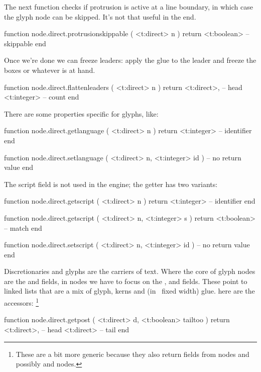 
The next function checks if protrusion is active at a line boundary, in which case the glyph
node can be skipped. It's not that useful in the end.

\starttyping[option=LUA]
function node.direct.protrusionskippable ( <t:direct> n )
    return <t:boolean> -- skippable
end
\stoptyping

Once we're done we can freeze leaders: apply the glue to the leader and freeze
the boxes or whatever is at hand.

\starttyping[option=LUA]
function node.direct.flattenleaders ( <t:direct> n )
    return
        <t:direct>, -- head
        <t:integer> -- count
end
\stoptyping

There are some properties specific for glyphs, like:

\starttyping[option=LUA]
function node.direct.getlanguage ( <t:direct> n )
    return <t:integer> -- identifier
end

function node.direct.setlanguage (
    <t:direct>  n,
    <t:integer> id
)
    -- no return value
end
\stoptyping

The script field is not used in the engine; the getter has two variants:

\starttyping[option=LUA]
function node.direct.getscript ( <t:direct> n )
    return <t:integer> -- identifier
end

function node.direct.getscript ( <t:direct> n, <t:integer> s )
    return <t:boolean> -- match
end

function node.direct.setscript (
    <t:direct>  n,
    <t:integer> id
)
    -- no return value
end
\stoptyping

\stopsubsection

\startsubsection[title=Discretionaries]

Discretionaries and glyphs are the carriers of text. Where the core of \type
{glyph} nodes are the  and  fields, in  nodes
we have to focus on the ,  and  fields.
These point to linked lists that are a mix of glyph, kerns and (in \LUAMETATEX\
fixed width) glue. here are the accessors: \footnote {These are a bit more
generic because they also return fields from \type {choice} nodes and possibly
\type {hlist} and \type {vlist} nodes.}

\starttyping[option=LUA]
function node.direct.getpost ( <t:direct> d, <t:boolean> tailtoo )
    return
        <t:direct>, -- head
        <t:direct>  -- tail
end

